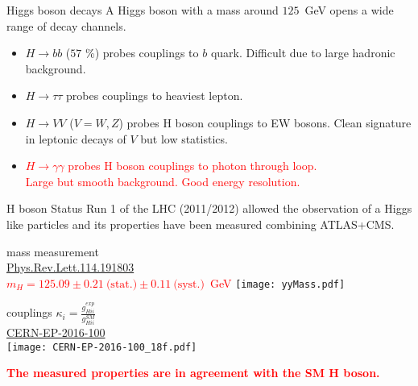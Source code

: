 \begin{frame}{Higgs boson decays}
  A Higgs boson with a mass around $125$~GeV opens a wide range of decay channels.
  
  \begin{minipage}{0.49\linewidth}
  \end{minipage}
  \hfill
  \begin{minipage}{0.49\linewidth}
    \begin{itemize}
    \item $H\rightarrow bb$ ($57$ \%) probes couplings to $b$ quark.
      Difficult due to large hadronic background.
    \item $H\rightarrow \tau\tau$ probes couplings to heaviest lepton.
    \item $H\rightarrow VV$ ($V=W,Z$) probes H boson couplings to EW bosons.
      Clean signature in leptonic decays of $V$ but low statistics.
    \end{itemize}
  \end{minipage}
  \begin{itemize}
    \item \textcolor{red}{$H\rightarrow\gamma\gamma$ probes H boson couplings to photon through loop.\\
      Large but smooth background. Good energy resolution.}
\end{itemize}
\end{frame}
\begin{frame}{H boson Status}
  Run 1 of the LHC (2011/2012) allowed the observation of a Higgs like particles and its properties have been measured combining ATLAS+CMS.
  \vfill
  \begin{minipage}[t]{0.59\linewidth}
    \centering
    mass measurement \\  \href{http://journals.aps.org/prl/pdf/10.1103/PhysRevLett.114.191803}{Phys.Rev.Lett.114.191803}\\
    \textcolor{red}{$m_H = 125.09 \pm 0.21~\text{(stat.)} \pm 0.11~\text{(syst.)} $~GeV}  
    \texttt{[image: yyMass.pdf]}
  \end{minipage}
  \hfill
  \begin{minipage}[t]{0.4\linewidth}
    \centering
    couplings $\kappa_i =\frac{g_{Hii}^{exp}}{g_{Hii}^{SM}}$ \\
    \href{https://cds.cern.ch/record/2158863}{CERN-EP-2016-100} \\
    \vfill
    \texttt{[image: CERN-EP-2016-100\_18f.pdf]} 
  \end{minipage}
\textcolor{red}{\bf The measured properties are in agreement with the SM H boson.}
\end{frame}
